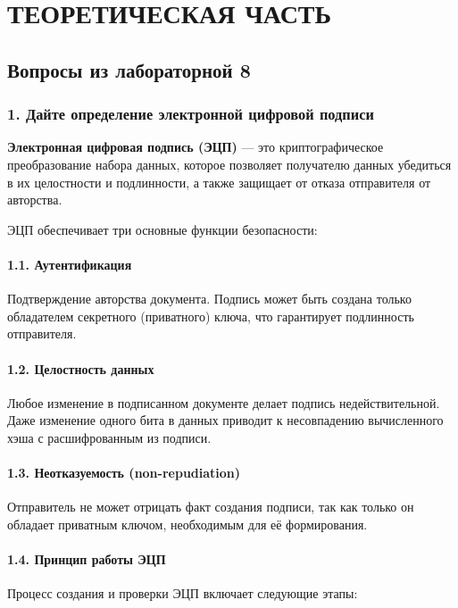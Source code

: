 \chapter*{ТЕОРЕТИЧЕСКАЯ ЧАСТЬ}

\section*{Вопросы из лабораторной 8}

\subsection*{1. Дайте определение электронной цифровой подписи}

\textbf{Электронная цифровая подпись (ЭЦП)} — это криптографическое преобразование набора данных, которое позволяет получателю данных убедиться в их целостности и подлинности, а также защищает от отказа отправителя от авторства.

ЭЦП обеспечивает три основные функции безопасности:

\subsubsection*{1.1. Аутентификация}
Подтверждение авторства документа. Подпись может быть создана только обладателем секретного (приватного) ключа, что гарантирует подлинность отправителя.

\subsubsection*{1.2. Целостность данных}
Любое изменение в подписанном документе делает подпись недействительной. Даже изменение одного бита в данных приводит к несовпадению вычисленного хэша с расшифрованным из подписи.

\subsubsection*{1.3. Неотказуемость (non-repudiation)}
Отправитель не может отрицать факт создания подписи, так как только он обладает приватным ключом, необходимым для её формирования.

\subsubsection*{1.4. Принцип работы ЭЦП}

Процесс создания и проверки ЭЦП включает следующие этапы:

